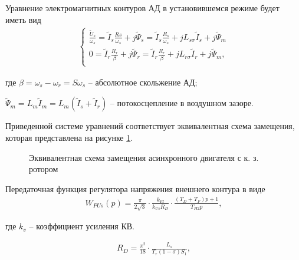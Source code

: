         Уравнение электромагнитных контуров АД в установившемся режиме будет
        иметь вид
        \begin{gather*}
            \left\{
            \begin{aligned}
                \frac{\tilde U_s}{\omega_s} =\tilde I_s\frac{Rs}{\omega_s}+
                    j\tilde \Psi_s=\tilde I_s\frac{R_s}{\omega_s}+
                        jL_{s\sigma}\tilde I_s +j\tilde \Psi_m\\
                0 = \tilde I_r\frac{R_r}{\beta}+j\tilde \Psi_r =
                    \tilde I_r\frac{R_r}{\beta}+jL_{r\sigma}\tilde I_r+
                        j \tilde \Psi_m,\\
            \end{aligned}
            \right.
        \end{gather*}

        где $\beta = \omega_s - \omega_r = S\omega_s$ -- абсолютное скольжение АД;\par
        $\tilde \Psi_m = L_m \tilde I_m = L_m(\tilde I_s + \tilde I_r)$ -- потокосцепление
        в воздушном зазоре.

        Приведенной системе уравнений соответствует эквивалентная схема
        замещения, которая представлена на рисунке \ref{fig:ad-zam}.  

        \begin{figure}[h!]
            \caption{Эквивалентная схема замещения асинхронного двигателя с к. з. ротором}
            \label{fig:ad-zam}
        \end{figure}

        Передаточная функция регулятора напряжения внешнего контура в виде
        \begin{gather*}
            W_{PUs}(p)=\frac{\pi}{2\sqrt{3}}\cdot\frac{k_{Id}}{k_{Us}R_D} \cdot
                \frac{(T_D + T_F) p+1}{T_{H2}p},
        \end{gather*}

        где $k_v$ -- коэффициент усиления КВ.

        \begin{gather*}
            R_D = \frac{\pi^2}{18} \cdot \frac{L_s}{T_r(1 - \sigma)S_1},
        \end{gather*}

